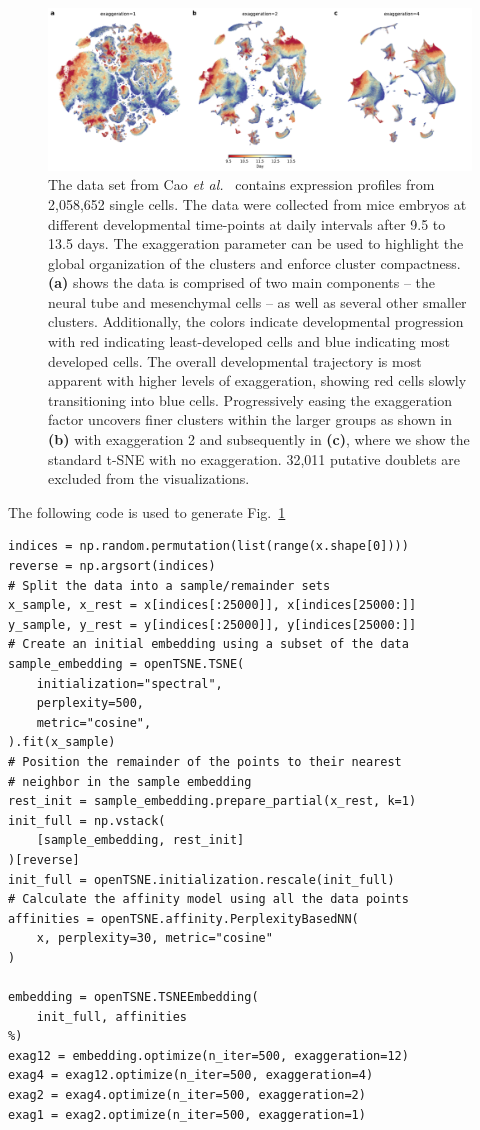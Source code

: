 \documentclass[twocolumn]{bmcart}
\begin{document}
\begin{figure}[htbp]
  \includegraphics[width=\textwidth]{cao2019}
  \caption{\label{fig:cao}The data set from Cao \textit{et al.}~\cite{cao2019single} contains expression profiles from 2,058,652 single cells. The data were collected from mice embryos at different developmental time-points at daily intervals after 9.5 to 13.5 days. The exaggeration parameter can be used to highlight the global organization of the clusters and enforce cluster compactness. \textbf{(a)} shows the data is comprised of two main components -- the neural tube and mesenchymal cells -- as well as several other smaller clusters. Additionally, the colors indicate developmental progression with red indicating least-developed cells and blue indicating most developed cells. The overall developmental trajectory is most apparent with higher levels of exaggeration, showing red cells slowly transitioning into blue cells. Progressively easing the exaggeration factor uncovers finer clusters within the larger groups as shown in \textbf{(b)} with exaggeration 2 and subsequently in \textbf{(c)}, where we show the standard t-SNE with no exaggeration. 32,011 putative doublets are excluded from the visualizations.}
\end{figure}


The following code is used to generate Fig.~\ref{fig:cao}
\begin{verbatim}
indices = np.random.permutation(list(range(x.shape[0])))
reverse = np.argsort(indices)
# Split the data into a sample/remainder sets
x_sample, x_rest = x[indices[:25000]], x[indices[25000:]]
y_sample, y_rest = y[indices[:25000]], y[indices[25000:]]
# Create an initial embedding using a subset of the data
sample_embedding = openTSNE.TSNE(
    initialization="spectral",
    perplexity=500,
    metric="cosine",
).fit(x_sample)
# Position the remainder of the points to their nearest
# neighbor in the sample embedding
rest_init = sample_embedding.prepare_partial(x_rest, k=1)
init_full = np.vstack(
    [sample_embedding, rest_init]
)[reverse]
init_full = openTSNE.initialization.rescale(init_full)
# Calculate the affinity model using all the data points
affinities = openTSNE.affinity.PerplexityBasedNN(
    x, perplexity=30, metric="cosine"
)

embedding = openTSNE.TSNEEmbedding(
    init_full, affinities
%)
exag12 = embedding.optimize(n_iter=500, exaggeration=12)
exag4 = exag12.optimize(n_iter=500, exaggeration=4)
exag2 = exag4.optimize(n_iter=500, exaggeration=2)
exag1 = exag2.optimize(n_iter=500, exaggeration=1)
\end{verbatim}
\end{document}
